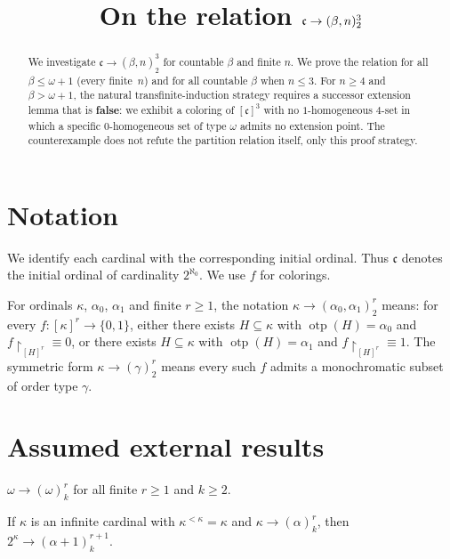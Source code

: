 \documentclass[11pt]{article}
\title{On the relation $\cc \to (\beta,n)^3_2$}
\author{}
\date{}
\theoremstyle{definition}
\theoremstyle{remark}
\newcommand{\cc}{\mathfrak{c}}
\newcommand{\otp}{\operatorname{otp}}
\begin{document}
\maketitle

\begin{abstract}
We investigate $\cc\to(\beta,n)^3_2$ for countable $\beta$ and finite $n$.
We prove the relation for all $\beta\le\omega+1$ (every finite~$n$) and for all countable $\beta$ when $n\le 3$.
For $n\ge 4$ and $\beta>\omega+1$, the natural transfinite-induction strategy requires a successor extension lemma that is \textbf{false}: we exhibit a coloring of $[\cc]^3$ with no $1$-homogeneous $4$-set in which a specific $0$-homogeneous set of type $\omega$ admits no extension point. The counterexample does not refute the partition relation itself, only this proof strategy.
\end{abstract}

\section{Notation}

We identify each cardinal with the corresponding initial ordinal. Thus $\cc$ denotes the initial ordinal of cardinality $2^{\aleph_0}$. We use $f$ for colorings.

For ordinals $\kappa$, $\alpha_0$, $\alpha_1$ and finite $r\ge 1$, the notation
$\kappa \to (\alpha_0,\alpha_1)^r_2$
means: for every $f:[\kappa]^r\to\{0,1\}$, either there exists $H\subseteq\kappa$ with $\otp(H)=\alpha_0$ and $f\!\restriction_{[H]^r}\equiv 0$, or there exists $H\subseteq\kappa$ with $\otp(H)=\alpha_1$ and $f\!\restriction_{[H]^r}\equiv 1$. The symmetric form $\kappa\to(\gamma)^r_2$ means every such $f$ admits a monochromatic subset of order type $\gamma$.

\section{Assumed external results}

\begin{description}[leftmargin=2em]
\item[Ramsey's theorem.] $\omega\to(\omega)^r_k$ for all finite $r\ge 1$ and $k\ge 2$.
\item[Stepping-up lemma (Erd\H{o}s--Rado).] If $\kappa$ is an infinite cardinal with $\kappa^{<\kappa}=\kappa$ and $\kappa\to(\alpha)^r_k$, then $2^\kappa\to(\alpha+1)^{r+1}_k$.
\end{description}
\end{document}
